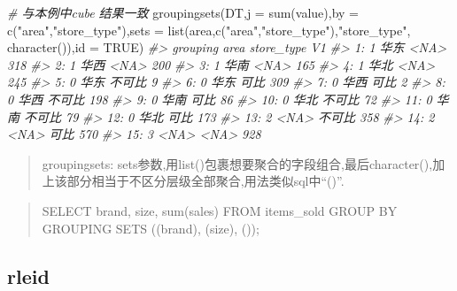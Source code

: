 \documentclass[
]{book}
\newenvironment{Shaded}{\begin{snugshade}}{\end{snugshade}}
\newcommand{\AttributeTok}[1]{\textcolor[rgb]{0.77,0.63,0.00}{#1}}
\newcommand{\CommentTok}[1]{\textcolor[rgb]{0.56,0.35,0.01}{\textit{#1}}}
\newcommand{\ConstantTok}[1]{\textcolor[rgb]{0.00,0.00,0.00}{#1}}
\newcommand{\FunctionTok}[1]{\textcolor[rgb]{0.00,0.00,0.00}{#1}}
\newcommand{\NormalTok}[1]{#1}
\newcommand{\StringTok}[1]{\textcolor[rgb]{0.31,0.60,0.02}{#1}}
\begin{document}
\begin{Shaded}
\begin{Highlighting}[]
\CommentTok{\# 与本例中cube 结果一致}
\FunctionTok{groupingsets}\NormalTok{(DT,}\AttributeTok{j =} \FunctionTok{sum}\NormalTok{(value),}\AttributeTok{by =} \FunctionTok{c}\NormalTok{(}\StringTok{"area"}\NormalTok{,}\StringTok{"store\_type"}\NormalTok{),}\AttributeTok{sets =} \FunctionTok{list}\NormalTok{(}\StringTok{\textquotesingle{}area\textquotesingle{}}\NormalTok{,}\FunctionTok{c}\NormalTok{(}\StringTok{"area"}\NormalTok{,}\StringTok{"store\_type"}\NormalTok{),}\StringTok{"store\_type"}\NormalTok{, }\FunctionTok{character}\NormalTok{()),}\AttributeTok{id =} \ConstantTok{TRUE}\NormalTok{)}
\CommentTok{\#\textgreater{}     grouping area store\_type  V1}
\CommentTok{\#\textgreater{}  1:        1 华东       \textless{}NA\textgreater{} 318}
\CommentTok{\#\textgreater{}  2:        1 华西       \textless{}NA\textgreater{} 200}
\CommentTok{\#\textgreater{}  3:        1 华南       \textless{}NA\textgreater{} 165}
\CommentTok{\#\textgreater{}  4:        1 华北       \textless{}NA\textgreater{} 245}
\CommentTok{\#\textgreater{}  5:        0 华东     不可比   9}
\CommentTok{\#\textgreater{}  6:        0 华东       可比 309}
\CommentTok{\#\textgreater{}  7:        0 华西       可比   2}
\CommentTok{\#\textgreater{}  8:        0 华西     不可比 198}
\CommentTok{\#\textgreater{}  9:        0 华南       可比  86}
\CommentTok{\#\textgreater{} 10:        0 华北     不可比  72}
\CommentTok{\#\textgreater{} 11:        0 华南     不可比  79}
\CommentTok{\#\textgreater{} 12:        0 华北       可比 173}
\CommentTok{\#\textgreater{} 13:        2 \textless{}NA\textgreater{}     不可比 358}
\CommentTok{\#\textgreater{} 14:        2 \textless{}NA\textgreater{}       可比 570}
\CommentTok{\#\textgreater{} 15:        3 \textless{}NA\textgreater{}       \textless{}NA\textgreater{} 928}
\end{Highlighting}
\end{Shaded}

\begin{quote}
groupingsets: sets参数,用list()包裹想要聚合的字段组合,最后character(),加上该部分相当于不区分层级全部聚合,用法类似sql中``()''.
\end{quote}

\begin{quote}
SELECT brand, size, sum(sales) FROM items\_sold GROUP BY GROUPING SETS ((brand), (size), ());
\end{quote}

\hypertarget{rleid}{%
\subsection{rleid}\label{rleid}}
\end{document}
